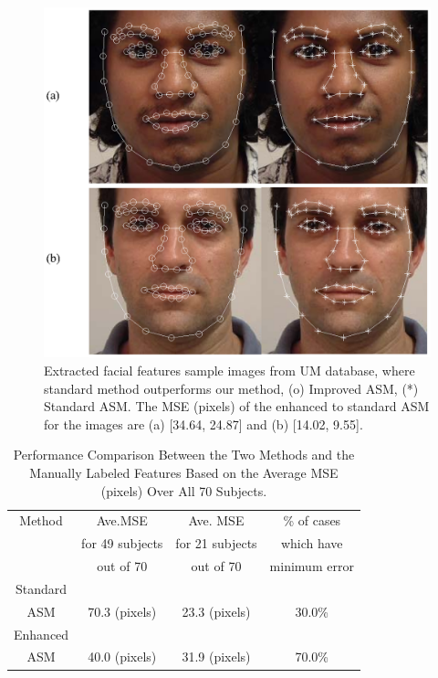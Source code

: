 \begin{figure}[tbp]
\begin{center}
\includegraphics[scale = 0.6]{./chapters/figures/pics_failed.eps}
\caption{Extracted facial features sample images from UM database,
where standard method outperforms our method, (o) Improved ASM, (*)
Standard ASM. The MSE (pixels) of the enhanced to standard ASM for
the images are (a) [34.64, 24.87] and (b) [14.02,
9.55].}\label{fig_ASM_results_failed}
\end{center}
\end{figure}

\begin{table}
\begin{center}
\caption{Performance Comparison Between the Two Methods and the
Manually Labeled Features Based on the Average MSE (pixels) Over All
70 Subjects.}
\begin{tabular}{|c|c|c|c|}
  \hline
  Method&Ave.MSE &Ave. MSE&\% of cases\\
  &for 49 subjects&for 21 subjects&which have\\
  &out of 70&out of 70&minimum error\\
  \hline
  Standard&&&\\
  ASM & 70.3 (pixels)& 23.3 (pixels)& 30.0\% \\
  \hline
  Enhanced&&&\\
  ASM & 40.0 (pixels)& 31.9 (pixels)& 70.0\% \\
  \hline
\end{tabular}
\\
\label{table_2}
\end{center}
\end{table}


